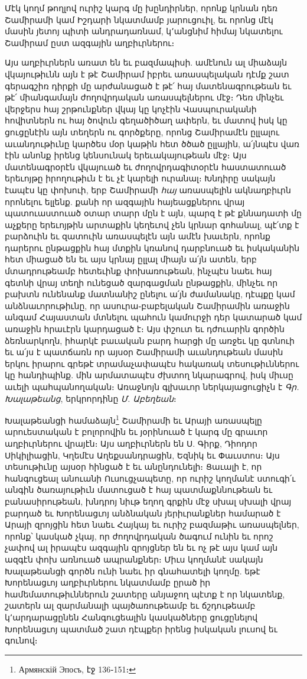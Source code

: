 \documentclass{article}
\begin{document}
{Մէկ կողմ թողլով ուրիշ կարգ մը խընդիրներ, որոնք կրնան դեռ Շամիրամի կամ Իշդարի նկատմամբ յարուցուիլ, եւ որոնց մէկ մասին յետոյ պիտի անդրադառնամ, կ՚անցնիմ հիմայ նկատելու Շամիրամ ըստ ազգային աղբիւրներու։

Այս աղբիւրներն առատ են եւ բազմապիսի. ամէնուն ալ միաձայն վկայութիւնն այն է թէ Շամիրամ իբրեւ առասպելական դէմք շատ գերագշիռ դիրքի մը արժանացած է թէ՛ հայ մատենագրութեան եւ թէ՛ միանգամայն ժողովրդական առասպելներու մէջ։ Դեռ մինչեւ վերջերս հայ շրթունքներ վկայ կը կոչէին Վասպուրականի հովիտներն ու հայ ծովուն գեղածիծաղ ափերն, եւ մատով իսկ կը ցուցընէին այն տեղերն ու գործքերը, որոնց Շամիրամէն ըլլալու աւանդութիւնը կարծես մօր կաթին հետ ծծած ըլլային, ա՛յնպէս վառ էին անոնք իրենց կենսունակ երեւակայութեան մէջ։ Այս մատենագրօրէն վկայուած եւ ժողովրդագիտօրէն հաստատուած երեւոյթը իրողութիւն է եւ չէ կարելի ուրանալ։ Խնդիրը սակայն էապէս կը փոխուի, երբ Շամիրամի \emph{հայ} առասպելին ակնաղբիւրն որոնելու ելլենք. քանի որ ազգային հայեացքներու վրայ պատուաստուած օտար տարր մըն է այն, պարզ է թէ քննադատի մը աչքերը երեւոյթին արտաքին կեղեւով չեն կրնար գոհանալ, պէ՛տք է բարձուին եւ զատուին առասպելէն այն ամէն խաւերն, որոնք դարերու ընթացքին հայ մտքին կռանով դարբնուած եւ իսկականին հետ միացած են եւ այս կրնայ ըլլալ միայն ա՛յն ատեն, երբ մտադրութեամբ հետեւինք փոխառութեան, ինչպէս նաեւ հայ գետնի վրայ տեղի ունեցած զարգացման ընթացքին, մինչեւ որ բախտն ունենանք մատնանիշ ընելու ա՛յն ժամանակը, դէպքը կամ անձնաւորութիւնը, որ ասուրա֊բաբելական Շամիրամին առաջին անգամ Հայաստան մտնելու պահուն կամուրջի դեր կատարած կամ առաջին հրաւէրն կարդացած է։ Այս փշուտ եւ դժուարին գործին ձեռնարկողն, իհարկէ բաւական բարդ հարցի մը առջեւ կը գտնուի եւ ա՛յս է պատճառն որ այսօր Շամիրամի աւանդութեան մասին երկու իրարու գրեթէ տրամաչափապէս հակառակ տեսութիւններու կը հանդիպինք. մին արմատապէս ժխտող նկարագրով, իսկ միւսը աւելի պահպանողական։ Առաջնոյն գլխաւոր ներկայացուցիչն է \emph{Գր. Խալաթեանց}, երկրորդինը \emph{Մ. Աբեղեան}։

Խալաթեանցի համաձայն\footnote{Армянскій Эпосъ, էջ 136֊151։} Շամիրամի եւ Արայի առասպելը արուեստական է բոլորովին եւ յօրինուած է կարգ մը գրաւոր աղբիւրներու վրայէն։ Այս աղբիւրներն են Ս. Գիրք, Դիոդոր Սիկիլիացին, Կղեմէս Աղեքսանդրացին, Եզնիկ եւ Փաւստոս։ Այս տեսութիւնը այսօր հինցած է եւ անընդունելի։ Ցաւալի է, որ հանգուցեալ անուանի Ուսուցչապետը, որ ուրիշ կողմանէ ստուգի՛ւ անգին ծառայութիւն մատուցած է հայ պատմաքննութեան եւ բանասիրութեան, խնդրոյ նիւթ եղող գրքին մէջ սխալ սխալի վրայ բարդած եւ Խորենացւոյ անձնական յերիւրանքներ համարած է Արայի զրոյցին հետ նաեւ Հայկայ եւ ուրիշ բազմաթիւ առասպելներ, որոնք՝ կասկած չկայ, որ ժողովրդական ծագում ունին եւ որոշ չափով ալ իրապէս ազգային զրոյցներ են եւ ոչ թէ այս կամ այն ազգէն փոխ առնուած ապրանքներ։ Միւս կողմանէ սակայն Խալաթեանցի գործն ունի նաեւ իր գնահատելի կողմը. եթէ Խորենացւոյ աղբիւրներու նկատմամբ ըրած իր համեմատութիւններուն շատերը անյաջող պէտք է որ նկատենք, շատերն ալ զարմանալի պայծառութեամբ եւ ճշդութեամբ կ՚արդարացընեն Հանգուցեալին կասկածները ցուցընելով Խորենացւոյ պատմած շատ դէպքեր իրենց իսկական լուսով եւ գունով։

}
\end{document}

